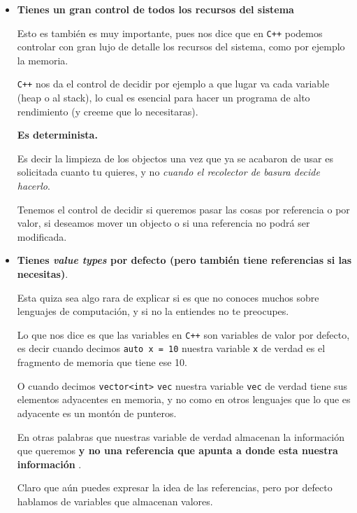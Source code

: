 \documentclass[12pt, fleqn]{report}                             %
\theoremstyle{break}                                            %
\newcommand{\textCode}[1]  { \texttt{#1} }                      %
\newcommand{\Cpp}{\ignorespaces\textCode{C++}}                  %
\begin{document}
\begin{itemize}
                \clearpage

                \item \textbf{Tienes un gran control de todos los recursos del sistema}
                
                    Esto es también es muy importante, pues nos dice que en \Cpp podemos controlar con gran lujo de detalle
                    los recursos del sistema, como por ejemplo la memoria.

                    \Cpp nos da el control de decidir por ejemplo a que lugar va cada variable (heap o al stack), 
                    lo cual es esencial para hacer un programa de alto rendimiento (y creeme que lo necesitaras).

                    \textbf{Es determinista.}

                    Es decir la limpieza de los objectos una vez que ya se acabaron de usar es solicitada cuanto tu quieres,
                    y no \textit{cuando el recolector de basura decide hacerlo}.

                    Tenemos el control de decidir si queremos pasar las cosas por referencia o por valor, si deseamos mover
                    un objecto o si una referencia no podrá ser modificada.

                \item \textbf{Tienes \textit{value types} por defecto (pero también tiene referencias si las necesitas)}.
                
                    Esta quiza sea algo rara de explicar si es que no conoces muchos sobre lenguajes de computación, y si
                    no la entiendes no te preocupes. 

                    Lo que nos dice es que las variables en \Cpp son variables de valor por defecto, es decir
                    cuando decimos \textCode{auto x = 10} nuestra variable \textCode{x} de verdad es el fragmento
                    de memoria que tiene ese 10.

                    O cuando decimos \textCode{vector<int>} \textCode{vec} nuestra variable \textCode{vec} de verdad tiene sus elementos adyacentes
                    en memoria, y no como en otros lenguajes que lo que es adyacente es un montón de punteros.
                    
                    En otras palabras que nuestras variable de verdad almacenan la información que queremos \textbf{
                        y no una referencia que apunta a donde esta nuestra información
                    }.

                    Claro que aún puedes expresar la idea de las referencias, pero por defecto hablamos de variables que almacenan valores.
            \end{itemize}
\end{document}
